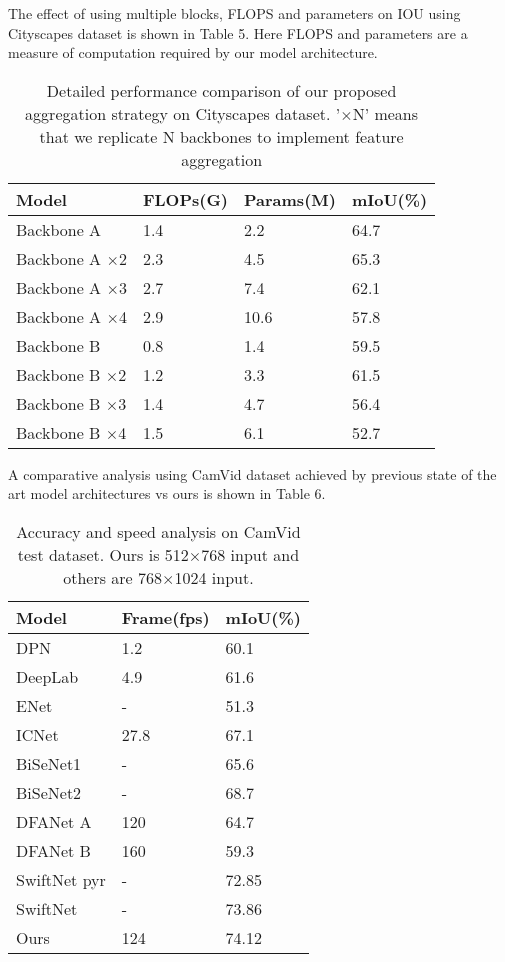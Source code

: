 \documentclass{article}
\begin{document}
The effect of using multiple blocks, FLOPS and parameters on IOU using Cityscapes dataset is shown in Table 5. Here FLOPS and parameters are a measure of computation required by our model architecture.

\begin{table}[h]
  \caption{Detailed performance comparison of our proposed aggregation strategy on Cityscapes dataset. ’$\times$N’ means that we replicate N backbones to implement feature aggregation}
  \label{sample-table5}
  \centering
  \begin{tabular}{llll}
  \toprule
    Model &FLOPs(G) &Params(M) &mIoU(\%)\\
   \midrule
    Backbone A &1.4 &2.2 &64.7\\
Backbone A $\times$2 &2.3  &4.5 &65.3\\
Backbone A $\times$3 &2.7 &7.4 &62.1\\
Backbone A $\times$4 &2.9 &10.6 &57.8\\
Backbone B &0.8 &1.4 &59.5\\
Backbone B $\times$2 &1.2 &3.3 &61.5\\
Backbone B $\times$3 &1.4 &4.7 &56.4\\
Backbone B $\times$4 &1.5 &6.1 &52.7\\
    \bottomrule
  \end{tabular}
\end{table}

A comparative analysis using CamVid dataset achieved by previous state of the art model architectures vs ours is shown in Table 6.

\begin{table}[h]
  \caption{Accuracy and speed analysis on CamVid test dataset. Ours is 512$\times$768 input and others are 768$\times$1024 input.}
  \label{sample-table6}
  \centering
  \begin{tabular}{lll}
  \toprule
    Model &Frame(fps) &mIoU(\%)\\
   \midrule
DPN \citep{yu2018learning} &1.2 &60.1\\
DeepLab \citep{chen2017deeplab} &4.9 &61.6\\
ENet \citep{paszke2016enet} &- &51.3\\
ICNet \citep{zhao2018icnet} &27.8 &67.1\\
BiSeNet1 \citep{yu2018bisenet} &- &65.6\\
BiSeNet2 \citep{yu2018bisenet} &- &68.7\\
DFANet A \citep{li2019dfanet} &120 &64.7\\
DFANet B \citep{li2019dfanet} &160 &59.3\\
SwiftNet pyr \citep{orsic2019defense} &- &72.85\\
SwiftNet \citep{orsic2019defense} &- &73.86\\
Ours &124 &74.12\\
    \bottomrule
  \end{tabular}
\end{table}
\end{document}
